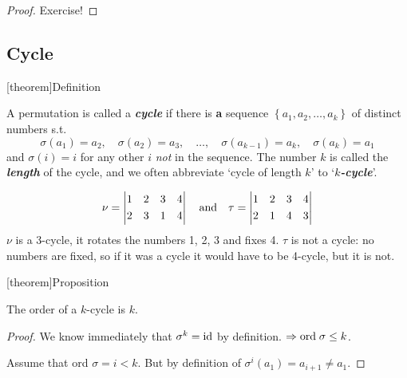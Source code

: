 \documentclass[12pt]{report}
\theoremstyle{definition}
\begin{document}
\begin{proof}
    Exercise!
\end{proof}

\subsection{Cycle}

[theorem]{Definition}
\begin{cycles}
    A permutation is called a \textbf{\emph{cycle}} if there is \textbf{a} sequence
    $\left\{a_1, a_2, \ldots, a_k\right\} $ of distinct numbers s.t.\[
        \sigma (a_1) = a_2,\quad \sigma(a_2) = a_3,\quad \ldots,\quad \sigma (a_{k-1}) = a_k,\quad \sigma (a_k) = a_1
    \]and $\sigma (i) = i$ for any other $i$ \emph{not} in the sequence.
    The number $k$ is called the \textbf{\emph{length}} of the cycle, and we often abbreviate 
    `cycle of length $k$' to `\textbf{\emph{$k$-cycle}}'.
\end{cycles}

\begin{ex}
    \[
        \nu = \left|
        \begin{align*}
            & 1 && 2 && 3 && 4 \\
            & 2 && 3 && 1 && 4
        \end{align*}
        \right|
        \quad \textnormal{and} \quad
        \tau= \left|
        \begin{align*}
            & 1 && 2 && 3 && 4 \\
            & 2 && 1 && 4 && 3
        \end{align*}
        \right| 
    \]
    $\nu$ is a 3-cycle, it rotates the numbers 1, 2, 3 and fixes 4.
    $\tau$ is not a cycle: no numbers are fixed, so if it was a cycle
    it would have to be 4-cycle, but it is not.
\end{ex}

[theorem]{Proposition}
\begin{order of k-cycle}
    The order of a $k$-cycle is $k$.
\end{order of k-cycle}

\begin{proof}
    We know immediately that $\sigma^{k} = \textnormal{id}$ by definition.
    $\Rightarrow \textnormal{ord}\; \sigma \le k$.
    
    Assume that ord $\sigma = i < k$. But by definition of $\sigma^{i}(a_1) = a_{i + 1} \neq a_1$.
\end{proof}
\end{document}
